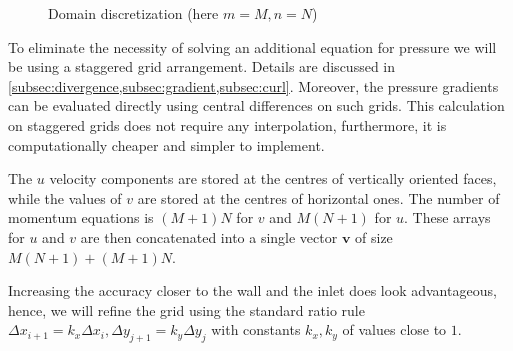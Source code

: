 \documentclass{article}
\numberwithin{equation}{section}
\begin{document}
\begin{figure}[H] %
  \caption{Domain discretization (here $m=M, n=N$)}\label{bl-domain-discretization}
\end{figure}

To eliminate the necessity of solving an additional equation for pressure we will be using a staggered grid arrangement. 
	Details are discussed in \cref{subsec:divergence,subsec:gradient,subsec:curl}. 
	Moreover, the pressure gradients can be evaluated directly using central differences on such grids. 
	This calculation on staggered grids does not require any interpolation, furthermore, it is computationally cheaper and simpler to implement. 

The $u$ velocity components are stored at the centres of vertically oriented faces, while the values of $v$ are stored at the centres of horizontal ones. 
	The number of momentum equations is $(M+1)N$ for $v$ and $M(N+1)$ for $u$. 
	These arrays for $u$ and $v$ are then concatenated into a single vector $\boldsymbol{v}$ of size $M(N+1)+(M+1)N$.

Increasing the accuracy closer to the wall and the inlet does look advantageous, hence, we will refine the grid using the standard ratio rule $\Delta x_{i+1}=k_x\Delta x_i,\Delta y_{j+1}=k_y\Delta y_j$ with constants $k_x,k_y$ of values close to $1$. 
	
\end{document}
